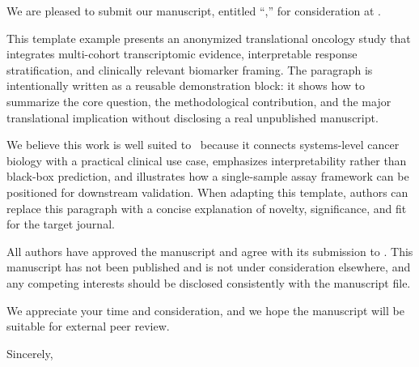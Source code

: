 \noindent \CoverLetterDate\par

\noindent \CoverLetterRecipient\par

\noindent \CoverLetterSalutation\par

\noindent We are pleased to submit our manuscript, entitled ``\CoverLetterManuscriptTitle,'' for consideration at \CoverLetterJournal.

\noindent This template example presents an anonymized translational oncology study that integrates multi-cohort transcriptomic evidence, interpretable response stratification, and clinically relevant biomarker framing. The paragraph is intentionally written as a reusable demonstration block: it shows how to summarize the core question, the methodological contribution, and the major translational implication without disclosing a real unpublished manuscript.

\noindent We believe this work is well suited to \CoverLetterJournal\ because it connects systems-level cancer biology with a practical clinical use case, emphasizes interpretability rather than black-box prediction, and illustrates how a single-sample assay framework can be positioned for downstream validation. When adapting this template, authors can replace this paragraph with a concise explanation of novelty, significance, and fit for the target journal.

\noindent All authors have approved the manuscript and agree with its submission to \CoverLetterJournal. This manuscript has not been published and is not under consideration elsewhere, and any competing interests should be disclosed consistently with the manuscript file.

\noindent We appreciate your time and consideration, and we hope the manuscript will be suitable for external peer review.

\noindent Sincerely,\par
\vspace{1.5\baselineskip}
\noindent \CoverLetterClosingName\par
\noindent \CoverLetterClosingRole\par
\noindent \CoverLetterClosingAffiliation\par
\noindent \CoverLetterClosingEmail\par

